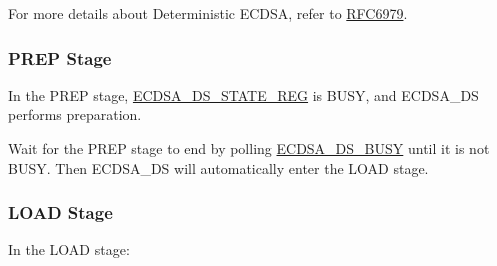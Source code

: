 \documentclass[main\_\_EN.tex]{subfiles}
\begin{document}
\begin{tiplisting}
For more details about Deterministic ECDSA, refer to \href{https://www.rfc-editor.org/rfc/rfc6979}{RFC6979}.
\end{tiplisting}

\subsubsection{PREP Stage}

In the PREP stage, \hyperref[regdesc:ECDSADSSTATEREG]{ECDSA\_DS\_STATE\_REG} is BUSY, and ECDSA\_DS performs preparation.

Wait for the PREP stage to end by polling \hyperref[fielddesc:ECDSADSBUSY]{ECDSA\_DS\_BUSY} until it is not BUSY. Then ECDSA\_DS will automatically enter the LOAD stage.

\subsubsection{LOAD Stage}
In the LOAD stage:
\end{document}
